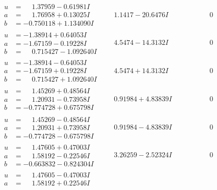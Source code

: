 \documentclass[1p]{elsarticle_modified}
\theoremstyle{definition}
\begin{document}
$$\begin{array}{c|c|c}
\begin{aligned}
u &= \phantom{-}1.37959 - 0.61981 I \\
a &= \phantom{-}1.76958 + 0.13025 I \\
b &= -0.750118 + 1.134090 I\end{aligned}
 & \phantom{-}1.1417 - 20.6476 I & \phantom{-0.000000 } 0 \\ \hline\begin{aligned}
u &= -1.38914 + 0.64053 I \\
a &= -1.67159 - 0.19228 I \\
b &= \phantom{-}0.715427 - 1.092640 I\end{aligned}
 & \phantom{-}4.5474 - 14.3132 I & \phantom{-0.000000 } 0 \\ \hline\begin{aligned}
u &= -1.38914 - 0.64053 I \\
a &= -1.67159 + 0.19228 I \\
b &= \phantom{-}0.715427 + 1.092640 I\end{aligned}
 & \phantom{-}4.5474 + 14.3132 I & \phantom{-0.000000 } 0 \\ \hline\begin{aligned}
u &= \phantom{-}1.45269 + 0.48564 I \\
a &= \phantom{-}1.20931 - 0.73958 I \\
b &= -0.774728 + 0.675798 I\end{aligned}
 & \phantom{-}0.91984 + 4.83839 I & \phantom{-0.000000 } 0 \\ \hline\begin{aligned}
u &= \phantom{-}1.45269 - 0.48564 I \\
a &= \phantom{-}1.20931 + 0.73958 I \\
b &= -0.774728 - 0.675798 I\end{aligned}
 & \phantom{-}0.91984 - 4.83839 I & \phantom{-0.000000 } 0 \\ \hline\begin{aligned}
u &= \phantom{-}1.47605 + 0.47003 I \\
a &= \phantom{-}1.58192 - 0.22546 I \\
b &= -0.663832 - 0.824304 I\end{aligned}
 & \phantom{-}3.26259 - 2.52324 I & \phantom{-0.000000 } 0 \\ \hline\begin{aligned}
u &= \phantom{-}1.47605 - 0.47003 I \\
a &= \phantom{-}1.58192 + 0.22546 I \\

\end{aligned}
\end{array}$$
\end{document}

